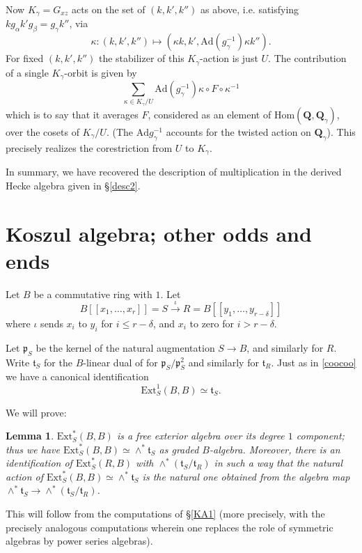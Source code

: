 \documentclass[10pt]{amsart}
\newcommand{\Ext}{\mathrm{Ext}}
\newcommand{\Ad}{\mathrm{Ad}}
\newcommand{\Hom}{\mathrm{Hom}}
\newtheorem{lemma}[subsection]{Lemma}
\theoremstyle{remark}
\begin{document}
 

  Now $K_{\gamma} = G_{xz}$ acts   on the set of $(k, k', k'')$ as above,  i.e. satisfying $k g_{\alpha} k' g_{\beta} = g_{\gamma} k''$, via $$ \kappa: (k, k', k'') \mapsto (\kappa k, k', \Ad(g_{\gamma}^{-1}) \kappa k'').$$ 
For fixed $(k, k', k'')$ the stabilizer of this $K_{\gamma}$-action is just $U$. 
The contribution of a single $K_{\gamma}$-orbit  is given by
$$ \sum_{\kappa \in K_{\gamma}/U} \Ad(g_{\gamma}^{-1})  \kappa \circ F \circ  \kappa^{-1} $$
which is to say that it averages $F$, considered as an element
of $\Hom(\mathbf{Q}, \mathbf{Q}_{\gamma})$, 
over the cosets of $K_{\gamma}/U$.  (The $\Ad g_{\gamma}^{-1}$ accounts for the twisted action on $\mathbf{Q}_{\gamma}$).
This precisely realizes
the  corestriction from $U$ to $K_{\gamma}$.  


In summary,  we have recovered the description of multiplication in the derived Hecke algebra given in \S \ref{desc2}. 
 
%

%

%
%
%
%
%
%
%
%
%
%
%
%
%
%
%
%
%
%
%
%
%

%
%
%
%
%
%
%
%
%
%


 


    
\section{  Koszul algebra; other odds and ends}\label{AppendixB}

   
Let $B$ be a commutative ring with $1$. 
Let $$B[[x_1, \dots, x_r]] = S \stackrel{\iota}{\longrightarrow} R = B[[y_1, \dots, y_{r-\delta}]]$$
where $\iota$ sends $x_i$ to $y_i$ for $i \leq r-\delta$,
and $x_i$ to zero for $i > r-\delta$. 

Let $\mathfrak{p}_S$ be the kernel of the natural augmentation $S \rightarrow B$, and similarly for $R$. 
 Write 
 $\mathfrak{t}_S$ for the $B$-linear dual of
for $\mathfrak{p}_S/\mathfrak{p}_S^2$ and similarly for $\mathfrak{t}_R$. 
Just as in  \eqref{coocoo} we have a canonical identification $$\Ext_S^1(B, B) \simeq \mathfrak{t}_S.$$ 
 
 
 We will prove:  

\begin{lemma} \label{KoszulExtComputation}
  $\Ext_S^*(B, B)$ is a free exterior algebra 
  over its degree $1$ component; thus we have $\Ext_S^*(B,B) \simeq \wedge^* \mathfrak{t}_S $
  as graded $B$-algebra.
Moreover, there  is an identification of $\Ext_S^*(R, B)$ with $\wedge^* (\mathfrak{t}_S/\mathfrak{t}_R)$
in such a way that the natural action of $\Ext_S^*(B, B) \simeq \wedge^* \mathfrak{t}_S$ is the natural one
obtained from the algebra map $\wedge^* \mathfrak{t}_S \rightarrow \wedge^* (\mathfrak{t}_S/\mathfrak{t}_R)$. 
\end{lemma}
This will follow from the computations of \S \ref{KA1} (more precisely, with  the precisely analogous computations wherein one replaces the role of symmetric algebras by power series algebras). 
\end{document}
